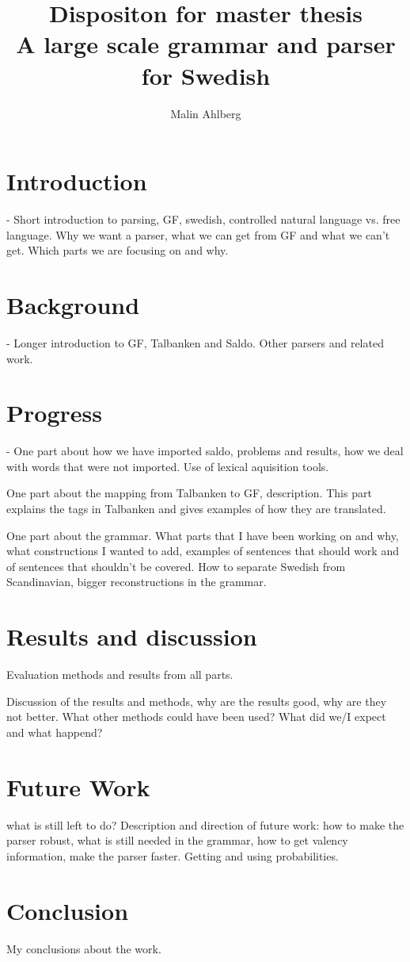 \documentclass{article}
\title{Dispositon for master thesis \\
      \small{A large scale grammar and parser for Swedish}}
\author{Malin Ahlberg
\institute{Department of Computer Science \& Engineering, Gothenburg University, Sweden}
}
\begin{document}
\maketitle

\section{Introduction} - 
Short introduction to parsing, GF, swedish, controlled natural language vs.
free language.
Why we want a parser, what we can get from GF and what we can't get.
Which parts we are focusing on and why.

\section{Background} - 
Longer introduction to GF, Talbanken and Saldo. Other parsers and related work.

\section{Progress} - 
One part about how we have imported saldo, problems and results, how we deal
with words that were not imported. Use of lexical aquisition tools.
 
One part about the mapping from Talbanken to GF, description. This part explains
the tags in Talbanken and gives examples of how they are translated.

One part about the grammar. What parts that I have been working on and why, 
what constructions I wanted to add, examples of sentences that should work
and of sentences that shouldn't be covered. How to separate Swedish from
Scandinavian, bigger reconstructions in the grammar. 

\section{Results and discussion}
Evaluation methods and results from all parts. 

Discussion of the results and methods, why are the results good, why are they not better.
What other methods could have been used? What did we/I expect and what happend?


\section{Future Work}
what is still left to do? Description and direction of future work:
how to make the parser robust, what is still needed in the grammar, 
how to get valency information, make the parser faster.
Getting and using probabilities.


\section{Conclusion}
My conclusions about the work.
\end{document}
